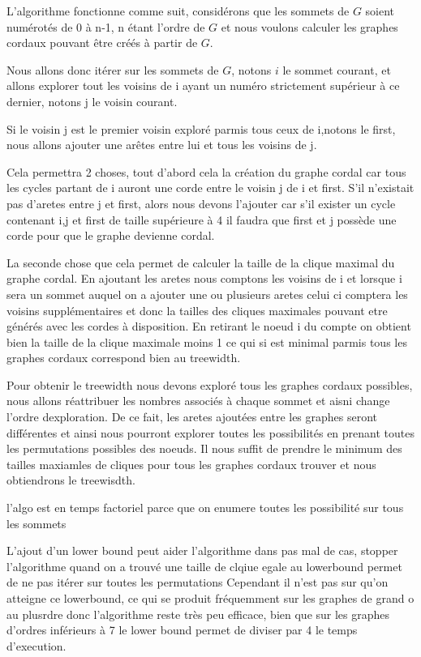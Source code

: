 \documentclass[a4paper, 12pt]{article}
\begin{document}
L'algorithme fonctionne comme suit, considérons que les sommets de $G$ soient numérotés 
de 0 à n-1, n étant l'ordre de $G$ et nous voulons calculer les graphes cordaux
pouvant être créés à partir de $G$.

Nous allons donc itérer sur les sommets de $G$, notons $i$ le sommet courant, et allons
explorer tout les voisins de i ayant un numéro strictement supérieur à ce 
dernier, notons j le voisin courant.

Si le voisin j est le premier voisin exploré parmis tous ceux de i,notons le first, 
nous allons ajouter une arêtes entre lui et tous les voisins de j. 

Cela permettra 2 choses, tout d'abord cela la création du graphe cordal
car tous les cycles partant de i auront une corde entre le voisin j de i et first.
S'il n'existait pas d'aretes entre j et first, alors nous devons l'ajouter car s'il exister un cycle contenant i,j et first de taille supérieure à 4 il faudra que first et j possède une corde pour que le graphe devienne cordal.

La seconde chose que cela permet de calculer la taille de la clique maximal du graphe
cordal. En ajoutant les aretes nous comptons les voisins de i et lorsque i sera un
sommet auquel on a ajouter une ou plusieurs aretes celui ci comptera les voisins 
supplémentaires et donc la tailles des cliques maximales pouvant etre générés
avec les cordes à disposition. En retirant le noeud i du compte on obtient bien la taille de la clique maximale moins 1 ce qui si est minimal parmis tous les graphes cordaux correspond bien au treewidth.

Pour obtenir le treewidth nous devons exploré tous les graphes cordaux possibles, 
nous allons réattribuer les nombres associés à chaque sommet et aisni change
l'ordre dexploration.
De ce fait, les aretes ajoutées entre les graphes seront différentes et ainsi nous 
pourront explorer toutes les possibilités en prenant toutes les permutations possibles 
des noeuds. Il nous suffit de prendre le minimum des tailles maxiamles de cliques pour 
tous les graphes cordaux trouver et nous obtiendrons le treewisdth.



l'algo est en temps factoriel parce que on enumere toutes les possibilité sur tous les sommets

L'ajout d'un lower bound peut aider l'algorithme dans pas mal de cas, stopper l'algorithme quand on a trouvé une taille de clqiue egale au lowerbound permet de ne pas itérer sur toutes les
permutations
Cependant il n'est pas sur qu'on atteigne ce lowerbound, ce qui se produit fréquemment sur les graphes de grand o au plusrdre donc l'algorithme reste très peu efficace, bien que sur les graphes d'ordres inférieurs à 7 le lower bound permet de diviser par 4 le temps d'execution.
\end{document}
